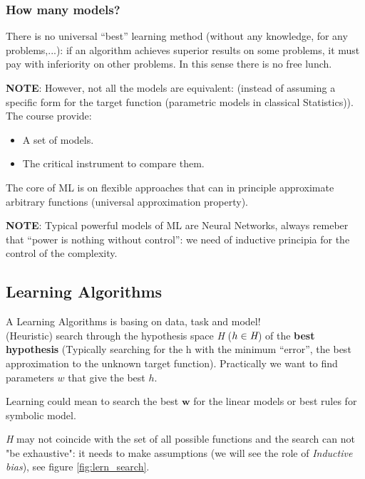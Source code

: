 \documentclass[../main.tex]{subfiles}
\begin{document}
\subsubsection{How many models?}
\begin{theorem}
There is no universal “best” learning method (without any knowledge, for any problems,...): if an algorithm achieves superior results on some problems, it must pay with inferiority on other problems. In this sense there is no free lunch.
\end{theorem}
\textbf{NOTE}: However, not all the models are equivalent: (instead of assuming a specific form for the target function (parametric models in classical Statistics)).\\
The course provide: 
\begin{itemize}
    \item A set of models.
    \item The critical instrument to compare them.
\end{itemize}
 

The core of ML is on flexible approaches that can in principle approximate arbitrary functions (universal approximation property).

\textbf{NOTE}: Typical powerful models of ML are Neural Networks, always remeber that “power is nothing without control”: we need of inductive principia for the control of the complexity.

\subsection{Learning Algorithms}
A Learning Algorithms is basing on data, task and model!\\
(Heuristic) search through the hypothesis space \emph{H} ($h \in \emph{H}$) of the \textbf{best hypothesis} (Typically searching for the h with the minimum “error”, the best approximation to the unknown target function). Practically we want to find parameters $w$ that give the best $h$.

\begin{example}
    Learning could mean to search the best $\boldsymbol{w}$  for the linear models or best rules for symbolic model.
\end{example}

\emph{H} may not coincide with the set of all possible functions and the search can not "be exhaustive": it needs to make assumptions (we will see the role of \emph{Inductive bias}), see figure \ref{fig:lern_search}.
\end{document}
